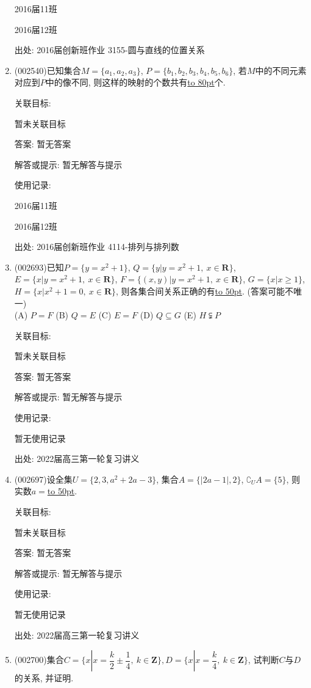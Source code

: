 \documentclass[10pt,a4paper]{article}
\newcommand{\blank}[1]{\underline{\hbox to #1pt{}}}
\begin{document}
\begin{enumerate}[1.]
2016届11班	

2016届12班	


出处: 2016届创新班作业	3155-圆与直线的位置关系
\item { (002540)}已知集合$M=\{a_1,a_2,a_3\}$, $P=\{b_1,b_2,b_3,b_4,b_5,b_6\}$, 若$M$中的不同元素对应到$P$中的像不同, 则这样的映射的个数共有\blank{80}个.


关联目标:

暂未关联目标

答案: 暂无答案

解答或提示: 暂无解答与提示

使用记录:

2016届11班	

2016届12班	


出处: 2016届创新班作业	4114-排列与排列数
\item { (002693)}已知$P=\{y=x^2+1\}$, $Q=\{y|y=x^2+1, \ x\in \mathbf{R}\}$, $E=\{x|y=x^2+1, \  x\in \mathbf{R}\}$, $F=\{(x,y)|y=x^2+1, \ x\in \mathbf{R}\}$, $G=\{x|x\ge 1\}$, $H=\{x|x^2+1=0, \ x\in \mathbf{R}\}$, 则各集合间关系正确的有\blank{50}. (答案可能不唯一)\\
(A) $P=F$   (B) $Q=E$   (C) $E=F$   (D) $Q\subseteq G$  (E) $H\subsetneqq P$


关联目标:

暂未关联目标

答案: 暂无答案

解答或提示: 暂无解答与提示

使用记录:

暂无使用记录


出处: 2022届高三第一轮复习讲义
\item { (002697)}设全集$U=\{2,3,a^2+2a-3\}$, 集合$A=\{|2a-1|,2\}$, $\complement_U A=\{5\}$, 则实数$a=$\blank{50}.


关联目标:

暂未关联目标

答案: 暂无答案

解答或提示: 暂无解答与提示

使用记录:

暂无使用记录


出处: 2022届高三第一轮复习讲义
\item { (002700)}集合$C=\{x|x=\dfrac k2\pm \dfrac14, \ k\in \mathbf{Z}\},D=\{x|x=\dfrac k4,\ k\in \mathbf{Z}\}$, 试判断$C$与$D$的关系, 并证明.



\end{enumerate}
\end{document}
